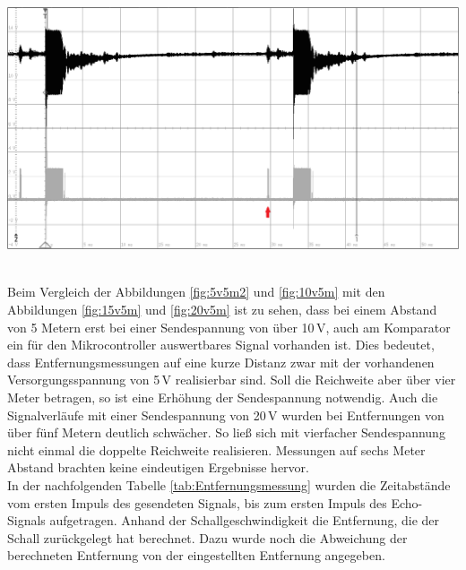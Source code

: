 \begin{minipage}{0.46\textwidth}
\includegraphics[width=1\textwidth%
]{Abbildungen/MessungenP2/20V/5mb.PNG}
\label{fig:20v5m}
\end{minipage}\\
Beim Vergleich der Abbildungen \ref{fig:5v5m2} und \ref{fig:10v5m} mit den Abbildungen \ref{fig:15v5m} und \ref{fig:20v5m}  ist zu sehen, dass bei einem Abstand von 5 Metern erst bei einer Sendespannung von über 10\,V, auch am Komparator ein für den Mikrocontroller auswertbares Signal vorhanden ist. Dies bedeutet, dass Entfernungsmessungen auf eine kurze Distanz zwar mit der vorhandenen Versorgungsspannung von 5\,V realisierbar sind. Soll die Reichweite aber über vier Meter betragen, so ist eine Erhöhung der Sendespannung notwendig. Auch die Signalverläufe mit einer Sendespannung von 20\,V wurden bei Entfernungen von über fünf Metern deutlich schwächer. So ließ sich mit vierfacher Sendespannung nicht einmal die doppelte Reichweite realisieren. Messungen auf sechs Meter Abstand brachten keine eindeutigen Ergebnisse hervor.\\
In der nachfolgenden Tabelle \ref{tab:Entfernungsmessung} wurden die Zeitabstände vom ersten Impuls des gesendeten Signals, bis zum ersten Impuls des Echo-Signals aufgetragen. Anhand der Schallgeschwindigkeit die Entfernung, die der Schall zurückgelegt hat berechnet. Dazu wurde noch die Abweichung der berechneten Entfernung von der eingestellten Entfernung angegeben.\\


